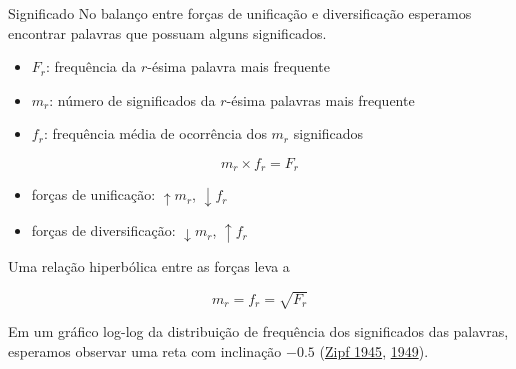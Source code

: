 \documentclass[
  ignorenonframetext,
  aspectratio=169]{beamer}
\providecommand{\tightlist}{%
  \setlength{\itemsep}{0pt}\setlength{\parskip}{0pt}}
\begin{document}
\begin{frame}[allowframebreaks]{Significado}
\protect\hypertarget{significado}{}
No balanço entre forças de unificação e diversificação esperamos
encontrar palavras que possuam alguns significados.

\begin{itemize}
\tightlist
\item
  \(F_r\): frequência da \(r\)-ésima palavra mais frequente
\item
  \(m_r\): número de significados da \(r\)-ésima palavras mais frequente
\item
  \(f_r\): frequência média de ocorrência dos \(m_r\) significados
\end{itemize}

\[ 
m_r \times f_r = F_r
\]

\begin{itemize}
\tightlist
\item
  forças de unificação: \(\uparrow m_r\), \(\downarrow f_r\)
\item
  forças de diversificação: \(\downarrow m_r\), \(\uparrow f_r\)
\end{itemize}

Uma relação hiperbólica entre as forças leva a

\[
m_r = f_r = \sqrt{F_r}
\]

Em um gráfico log-log da distribuição de frequência dos significados das
palavras, esperamos observar uma reta com inclinação \(-0.5\)
(\protect\hyperlink{ref-zipf1945}{Zipf 1945},
\protect\hyperlink{ref-zipf1949}{1949}).

\end{frame}
\end{document}
